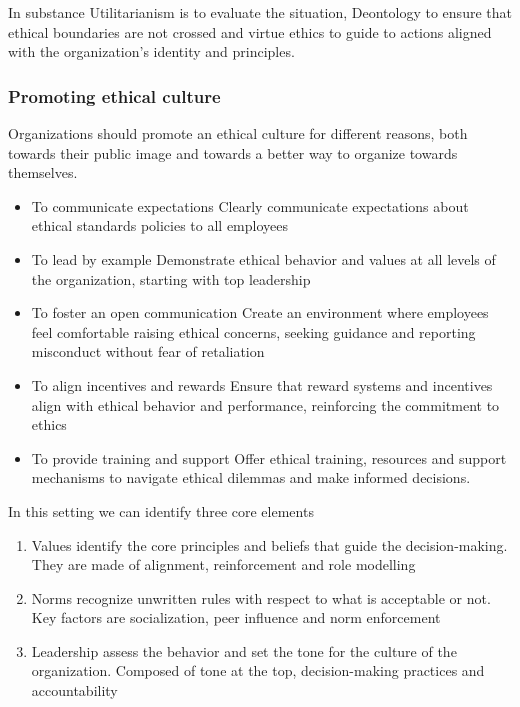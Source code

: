 In substance Utilitarianism is to evaluate the situation, Deontology to ensure that ethical boundaries are not crossed and virtue ethics to guide to actions aligned with the organization's identity and principles. 






















\subsubsection{Promoting ethical culture}


Organizations should promote an ethical culture for different reasons, both towards their public image and towards a better way to organize towards themselves.

\begin{itemize}
    \item To communicate expectations \ra Clearly communicate expectations about ethical standards policies to all employees
    \item To lead by example \ra Demonstrate ethical behavior and values at all levels of the organization, starting with top leadership
    \item To foster an open communication \ra Create an environment where employees feel comfortable raising ethical concerns, seeking guidance and reporting misconduct without fear of retaliation
    \item To align incentives and rewards \ra Ensure that reward systems and incentives align with ethical behavior and performance, reinforcing the commitment to ethics
    \item To provide training and support \ra Offer ethical training, resources and support mechanisms to navigate ethical dilemmas and make informed decisions.
\end{itemize}

In this setting we can identify three core elements
\begin{enumerate}
    \item Values \ra identify the core principles and beliefs that guide the decision-making. They are made of alignment, reinforcement and role modelling
    \item Norms \ra recognize unwritten rules with respect to what is acceptable or not. Key factors are socialization, peer influence and norm enforcement
    \item Leadership \ra assess the behavior and set the tone for the culture of the organization. Composed of tone at the top, decision-making practices and accountability
\end{enumerate}



